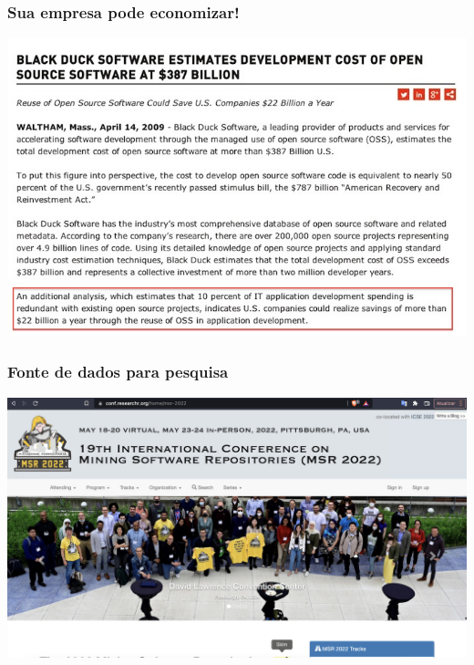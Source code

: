 \documentclass[xcolor=dvipsnames]{beamer}
\begin{document}
\begin{frame}
	\frametitle{Sua empresa pode economizar!}
 	\includegraphics[scale=0.45]{economia2.jpg}	
\end{frame}

\begin{frame}
	\frametitle{Fonte de dados para pesquisa}
 	\includegraphics[scale=0.45]{msr.png}
\end{frame}


\section{}
\end{document}
